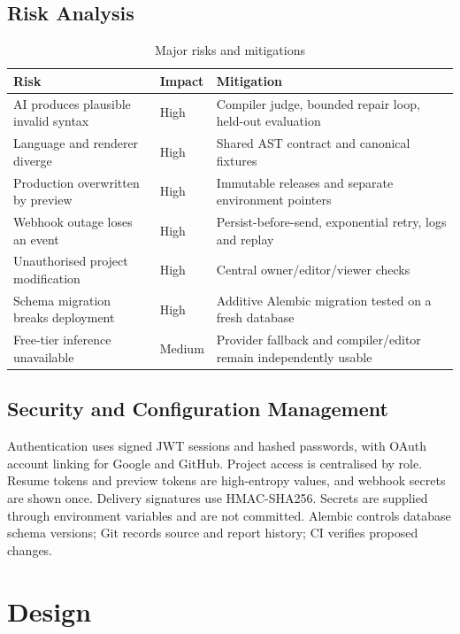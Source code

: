 \documentclass[12pt,a4paper,oneside]{report}
\begin{document}
\subsection{Risk Analysis}
\begin{table}[H]
\centering
\caption{Major risks and mitigations}
\label{tab:risks}
\begin{tabularx}{\textwidth}{p{}p{}X}
\toprule
Risk & Impact & Mitigation\\
\midrule
AI produces plausible invalid syntax & High & Compiler judge, bounded repair loop, held-out evaluation\\
Language and renderer diverge & High & Shared AST contract and canonical fixtures\\
Production overwritten by preview & High & Immutable releases and separate environment pointers\\
Webhook outage loses an event & High & Persist-before-send, exponential retry, logs and replay\\
Unauthorised project modification & High & Central owner/editor/viewer checks\\
Schema migration breaks deployment & High & Additive Alembic migration tested on a fresh database\\
Free-tier inference unavailable & Medium & Provider fallback and compiler/editor remain independently usable\\
\bottomrule
\end{tabularx}
\end{table}

\subsection{Security and Configuration Management}
Authentication uses signed JWT sessions and hashed passwords, with OAuth account linking for
Google and GitHub. Project access is centralised by role. Resume tokens and preview tokens are
high-entropy values, and webhook secrets are shown once. Delivery signatures use HMAC-SHA256.
Secrets are supplied through environment variables and are not committed. Alembic controls
database schema versions; Git records source and report history; CI verifies proposed changes.

\section{Design}
\end{document}
